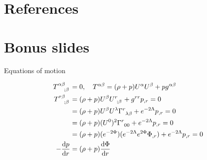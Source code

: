 \documentclass{beamer}
\let\svthefootnote\thefootnote
\newcommand\blankfootnote[1]{%
  \let\thefootnote\relax\footnotetext{#1}%
  \let\thefootnote\svthefootnote%
}
\begin{document}



\section{References}


\begin{frame}[allowframebreaks]

\printbibliography[heading=subbibliography]

\end{frame}




\section{Bonus slides}

\begin{frame}{Equations of motion}

\begin{align*}
  \tensor{T}{^{\alpha\beta}_{;\beta}} &= 0,
  \quad
  \tensor{T}{^{\alpha\beta}} = (\rho + p) U^\alpha U^\beta + p g^{\alpha\beta}
  \\
  \tensor{T}{^{r\beta}_{;\beta}} &=
  (\rho + p) U^\beta \tensor{U}{^r_{;\beta}} + g^{rr} p_{,r} = 0
  \\ &=
  (\rho + p) U^\beta U^\lambda \tensor{\Gamma}{^r_{\lambda\beta}} +
  e^{-2\Lambda} p_{,r} = 0
  \\ &=
  (\rho + p) (U^0)^2 \tensor{\Gamma}{^r_{00}} + e^{-2\Lambda} p_{,r} = 0
  \\ &=
  (\rho + p) (e^{-2\Phi}) (e^{-2\Lambda} e^{2\Phi} \Phi_{,r}) +
  e^{-2\Lambda} p_{,r} = 0
  \\
 -\dv{p}{r} &=
  (\rho + p) \dv{\Phi}{r}
\end{align*}

\blankfootnote{\textcite[pp. 101, 261]{Schutz}}

\end{frame}
\end{document}
